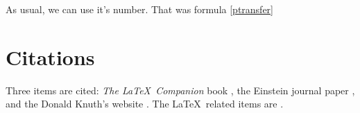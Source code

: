 \documentclass[12pt]{article}
\begin{document}
	As usual, we can use it's number. That was formula \eqref{ptransfer}

  \section{Citations}

  Three items are cited: \textit{The \LaTeX\ Companion} book \cite{latexcompanion}, the Einstein journal paper \cite{einstein}, and the Donald Knuth's website \cite{knuthwebsite}. The \LaTeX\ related items are \cite{latexcompanion,knuthwebsite}.

  
\end{document}
